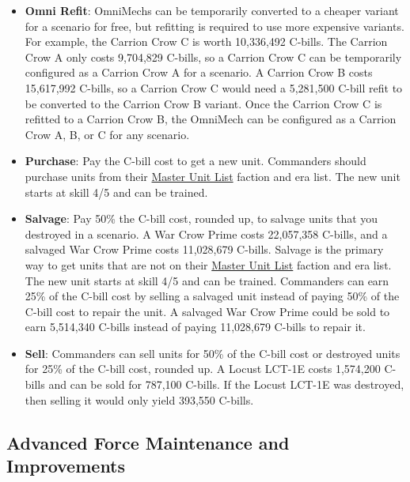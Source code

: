 \documentclass{article}
\begin{document}
\begin{itemize}
\item {\bfseries Omni Refit}: OmniMechs can be temporarily converted to a cheaper variant for a scenario for free, but refitting is required to use more expensive variants.
For example, the Carrion Crow C is worth 10,336,492 C-bills.
The Carrion Crow A only costs 9,704,829 C-bills, so a Carrion Crow C can be temporarily configured as a Carrion Crow A for a scenario.
A Carrion Crow B costs 15,617,992 C-bills, so a Carrion Crow C would need a 5,281,500 C-bill refit to be converted to the Carrion Crow B variant.
Once the Carrion Crow C is refitted to a Carrion Crow B, the OmniMech can be configured as a Carrion Crow A, B, or C for any scenario.

\item {\bfseries Purchase}: Pay the C-bill cost to get a new unit.
Commanders should purchase units from their \href{http://www.masterunitlist.info}{Master Unit List} faction and era list.
The new unit starts at skill 4/5 and can be trained.

\item {\bfseries Salvage}: Pay 50\% the C-bill cost, rounded up, to salvage units that you destroyed in a scenario.
A War Crow Prime costs 22,057,358 C-bills, and a salvaged War Crow Prime costs 11,028,679 C-bills.
Salvage is the primary way to get units that are not on their \href{http://www.masterunitlist.info}{Master Unit List} faction and era list.
The new unit starts at skill 4/5 and can be trained.
Commanders can earn 25\% of the C-bill cost by selling a salvaged unit instead of paying 50\% of the C-bill cost to repair the unit.
A salvaged War Crow Prime could be sold to earn 5,514,340 C-bills instead of paying 11,028,679 C-bills to repair it.

\item {\bfseries Sell}: Commanders can sell units for 50\% of the C-bill cost or destroyed units for 25\% of the C-bill cost, rounded up.
A Locust LCT-1E costs 1,574,200 C-bills and can be sold for 787,100 C-bills.
If the Locust LCT-1E was destroyed, then selling it would only yield 393,550 C-bills.

\end{itemize}

\newpage

\subsection{Advanced Force Maintenance and Improvements}
\end{document}
